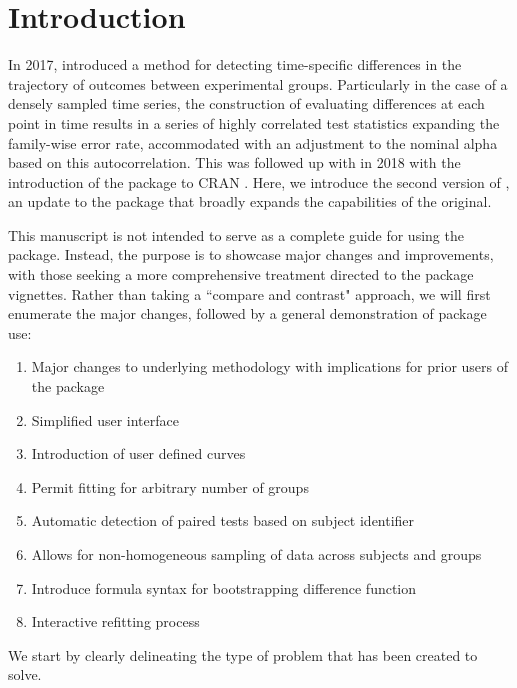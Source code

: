 \section{Introduction}



In 2017,  \citet{oleson2017detecting} introduced a method for detecting time-specific differences in the trajectory of outcomes between experimental groups. Particularly in the case of a densely sampled time series, the construction of evaluating differences at each point in time results in a series of highly correlated test statistics expanding the family-wise error rate, accommodated with an adjustment to the nominal alpha based on this autocorrelation. This was followed up with in 2018 with the introduction of the  package to CRAN \citep{seedorff2018bdots}. Here, we introduce the second version of , an update to the package that broadly expands the capabilities of the original. 

This manuscript is not intended to serve as a complete guide for using the  package. Instead, the purpose is to showcase major changes and improvements, with those seeking a more comprehensive treatment directed to the package vignettes. Rather than taking a ``compare and contrast" approach, we will first enumerate the major changes, followed by a general demonstration of package use:

\begin{singlespace}
\begin{enumerate}
\item Major changes to underlying methodology with implications for prior users of the package
\item Simplified user interface
\item Introduction of user defined curves
\item Permit fitting for arbitrary number of groups
\item Automatic detection of paired tests based on subject identifier
\item Allows for non-homogeneous sampling of data across subjects and groups
\item Introduce formula syntax for bootstrapping difference function
\item Interactive refitting process
\end{enumerate}
\end{singlespace}


We start by clearly delineating the type of problem that  has been created to solve.

